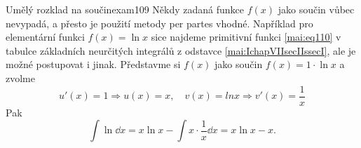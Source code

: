 \begin{mathexam}{Umělý rozklad na součin}{exam109}
  Někdy zadaná funkce \(f(x)\) jako součin vůbec nevypadá, a přesto je použití metody per partes
  vhodné. Například pro elementární funkci \(f(x) = \ln x\) sice najdeme primitivní funkci
  \ref{mai:eq110} v tabulce základních neurčitých integrálů z odstavce \ref{mai:IchapVIIsecIIssecI},
  ale je možné postupovat i jinak. Představme si \(f(x)\) jako součin \(f(x) = 1\cdot\ln x\) a
  zvolme \[u'(x) = 1 ⇒ u(x) = x, \quad v(x) = lnx ⇒ v'(x) = \frac{1}{x}\] Pak 
  \begin{equation*}
    \int\ln\dd{x} = x\ln x - \int x\cdot\frac{1}{x}\dd{x}= x\ln x - x.
  \end{equation*}
\end{mathexam}